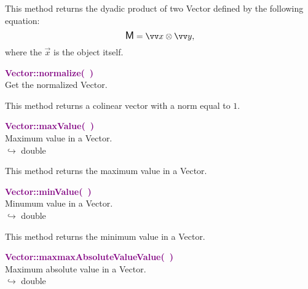 This method returns the dyadic product of two Vector defined by the following equation:
\begin{equation*}
\M = \overrightarrow{x}\otimes\overrightarrow{y},
\end{equation*}
where the $\overrightarrow{x}$ is the object itself.

\textcolor{purple}{\textbf{Vector::normalize(~)}}\label{Vector::normalize()}\\
Get the normalized Vector.

This method returns a colinear vector with a norm equal to $1$.

\textcolor{purple}{\textbf{Vector::maxValue(~)}}\label{Vector::maxValue()}\\
Maximum value in a Vector.\\ \hspace*{10mm}$\hookrightarrow$ double

This method returns the maximum value in a Vector.

\textcolor{purple}{\textbf{Vector::minValue(~)}}\label{Vector::minValue()}\\
Minumum value in a Vector.\\ \hspace*{10mm}$\hookrightarrow$ double

This method returns the minimum value in a Vector.

\textcolor{purple}{\textbf{Vector::maxmaxAbsoluteValueValue(~)}}\label{Vector::maxmaxAbsoluteValueValue()}\\
Maximum absolute value in a Vector.\\ \hspace*{10mm}$\hookrightarrow$ double

